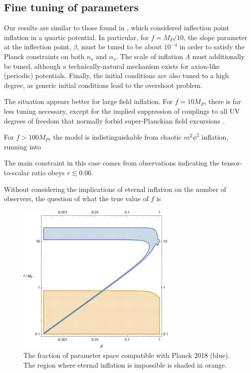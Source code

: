\documentclass[aps,amsfonts,amsmath,prd,preprint,nofootinbib]{revtex4}
\newcommand{\Mp}{{M_{P}}}
\begin{document}

\subsection{Fine tuning of parameters}
Our results are similar to those found in \cite{Musoke:2017frr}, which considered inflection point inflation in a quartic potential.  In particular, for $f = \Mp/10$, the slope parameter at the inflection point, $\beta$, must be
tuned to be about $10^{-4}$ in order to satisfy the Planck constraints on both $n_s$ and $\alpha_s$.  The scale of inflation $\Lambda$ must additionally be tuned, although a technically-natural mechanism exists for axion-like (periodic) potentials.  Finally, the initial conditions are also tuned to a high degree, as generic initial conditions lead to the overshoot problem.

The situation appears better for large field inflation.
For $f = 10 \Mp$, there is far less tuning necessary, except for the implied suppression of couplings to all UV degrees of freedom that normally forbid super-Planckian field excursions \cite{swampland, monodromy}.

For $f > 100 \Mp$, the model is indistinguishable from chaotic $m^2\phi^2$ inflation, running into  

The main constraint in this case comes from observations indicating the tensor-to-scalar ratio obeys $r \lesssim 0.06$.

Without considering the implications of eternal inflation on the number of observers, the question of what the true value of $f$ is 


\begin{figure}[!h]
  \centering
    \includegraphics[width=0.7\textwidth]{figures/fbregionPlanck2018.pdf}
    \caption{The fraction of parameter space compatible with Planck 2018 (blue).  The region where eternal inflation is impossible is shaded in orange.}
\end{figure}
\end{document}
